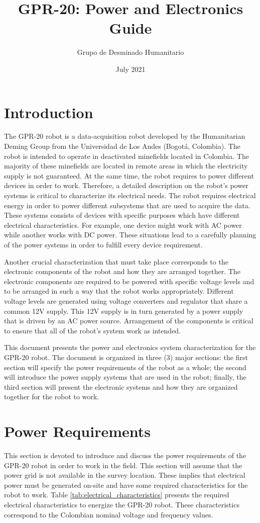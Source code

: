 \documentclass{article}
\title{GPR-20: Power and Electronics Guide}
\author{Grupo de Desminado Humanitario}
\date{July 2021}
\begin{document}


\clearpage
\section{Introduction}
The GPR-20 robot is a data-acquisition robot developed by the Humanitarian Deming Group from the Universidad de Los Andes (Bogotá, Colombia). The robot is intended to operate in deactivated minefields located in Colombia. The majority of these minefields are located in remote areas in which the electricity supply is not guaranteed. At the same time, the robot requires to power different devices in order to work. Therefore, a detailed description on the robot's power systems is critical to characterize its electrical needs. The robot requires electrical energy in order to power different subsystems that are used to acquire the data. These systems consists of devices with specific purposes which have different electrical characteristics. For example, one device might work with AC power while another works with DC power. These situations lead to a carefully planning of the power systems in order to fulfill every device requirement.

Another crucial characterization that must take place corresponds to the electronic components of the robot and how they are arranged together. The electronic components are required to be powered with specific voltage levels and to be arranged in such a way that the robot works appropriately. Different voltage levels are generated using voltage converters and regulator that share a common 12V supply. This 12V supply is in turn generated by a power supply that is driven by an AC power source. Arrangement of the components is critical to ensure that all of the robot's system work as intended. 

This document presents the power and electronics system characterization for the GPR-20 robot. The document is organized in three (3) major sections: the first section will specify the power requirements of the robot as a whole; the second will introduce the power supply systems that are used in the robot; finally, the third section will present the electronic systems and how they are organized together for the robot to work. 


\clearpage
\section{Power Requirements}
This section is devoted to introduce and discuss the power requirements of the GPR-20 robot in order to work in the field. This section will assume that the power grid is not available in the survey location. These implies that electrical power must be generated on-site and have some required characteristics for the robot to work. Table \ref{tab:electrical_characteristics} presents the required electrical characteristics to energize the GPR-20 robot. These characteristics correspond to the Colombian nominal voltage and frequency values.
\end{document}
